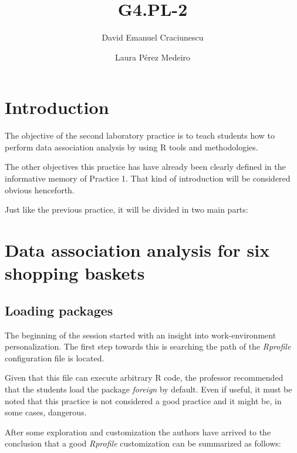 \documentclass[a4paper]{article}
\begin{document}
\title{G4.PL-2}
\author{David Emanuel Craciunescu \and Laura Pérez Medeiro}

\maketitle


\section*{Introduction}

The objective of the second laboratory practice is to teach students how to
perform data association analysis by using R tools and methodologies.

The other objectives this practice has have already been clearly defined in the
informative memory of Practice 1. That kind of introduction will be considered
obvious henceforth.

Just like the previous practice, it will be divided in two main parts:


\section*{Data association analysis for six shopping baskets}


\subsection*{Loading packages}
The beginning of the session started with an insight into work-environment
personalization. The first step towards this is searching the path of the
\textit{Rprofile} configuration file is located.

Given that this file can execute arbitrary R code, the professor recommended
that the students load the package \textit{foreign} by default. Even if useful,
it must be noted that this practice is not considered a good practice and it
might be, in some cases, dangerous.

After some exploration and customization the authors have arrived to the
conclusion that a good \textit{Rprofile} customization can be summarized as
follows:
\end{document}
